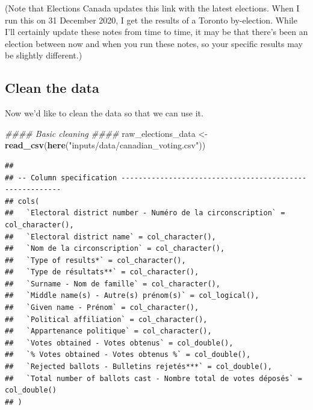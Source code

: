 \documentclass[
]{book}
\newenvironment{Shaded}{\begin{snugshade}}{\end{snugshade}}
\newcommand{\CommentTok}[1]{\textcolor[rgb]{0.56,0.35,0.01}{\textit{#1}}}
\newcommand{\KeywordTok}[1]{\textcolor[rgb]{0.13,0.29,0.53}{\textbf{#1}}}
\newcommand{\NormalTok}[1]{#1}
\newcommand{\StringTok}[1]{\textcolor[rgb]{0.31,0.60,0.02}{#1}}
\begin{document}
(Note that Elections Canada updates this link with the latest elections. When I run this on 31 December 2020, I get the results of a Toronto by-election. While I'll certainly update these notes from time to time, it may be that there's been an election between now and when you run these notes, so your specific results may be slightly different.)

\hypertarget{clean-the-data}{%
\subsection{Clean the data}\label{clean-the-data}}

Now we'd like to clean the data so that we can use it.

\begin{Shaded}
\begin{Highlighting}[]
\CommentTok{#### Basic cleaning ####}
\NormalTok{raw_elections_data <-}\StringTok{ }\KeywordTok{read_csv}\NormalTok{(}\KeywordTok{here}\NormalTok{(}\StringTok{"inputs/data/canadian_voting.csv"}\NormalTok{))}
\end{Highlighting}
\end{Shaded}

\begin{verbatim}
## 
## -- Column specification --------------------------------------------------------
## cols(
##   `Electoral district number - Numéro de la circonscription` = col_character(),
##   `Electoral district name` = col_character(),
##   `Nom de la circonscription` = col_character(),
##   `Type of results*` = col_character(),
##   `Type de résultats**` = col_character(),
##   `Surname - Nom de famille` = col_character(),
##   `Middle name(s) - Autre(s) prénom(s)` = col_logical(),
##   `Given name - Prénom` = col_character(),
##   `Political affiliation` = col_character(),
##   `Appartenance politique` = col_character(),
##   `Votes obtained - Votes obtenus` = col_double(),
##   `% Votes obtained - Votes obtenus %` = col_double(),
##   `Rejected ballots - Bulletins rejetés***` = col_double(),
##   `Total number of ballots cast - Nombre total de votes déposés` = col_double()
## )
\end{verbatim}
\end{document}
